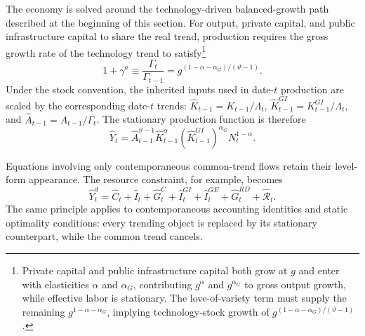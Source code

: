 \documentclass[a4paper,11pt]{article}
\begin{document}
The economy is solved around the technology-driven balanced-growth path described at the beginning of this section.
For output, private capital, and public infrastructure capital to share the real trend, production requires the gross growth rate of the technology trend to satisfy\footnote{Private capital and public infrastructure capital both grow at $g$ and enter with elasticities $\alpha$ and $\alpha_G$, contributing $g^{\alpha}$ and $g^{\alpha_G}$ to gross output growth, while effective labor is stationary. The love-of-variety term must supply the remaining $g^{1-\alpha-\alpha_G}$, implying technology-stock growth of $g^{(1-\alpha-\alpha_G)/(\vartheta-1)}$.}
\begin{equation} \label{eq:techtrend}
    1+\gamma^a\equiv\frac{\Gamma_t}{\Gamma_{t-1}}
    =g^{(1-\alpha-\alpha_G)/(\vartheta-1)}.
\end{equation}
Under the stock convention, the inherited inputs used in date-$t$ production are scaled by the corresponding date-$t$ trends: $\hat K_{t-1}=K_{t-1}/\Lambda_t$, $\hat K_{t-1}^{GI}=K_{t-1}^{GI}/\Lambda_t$, and $\hat A_{t-1}=A_{t-1}/\Gamma_t$.
The stationary production function is therefore
\begin{equation} \label{eq:prodstat}
    \hat{Y}_t = \hat{A}_{t-1}^{\vartheta-1} \hat K_{t-1}^{\alpha} \left( \hat K_{t-1}^{GI}\right)^{\alpha_G} N_t^{1-\alpha}.
\end{equation}

Equations involving only contemporaneous common-trend flows retain their level-form appearance.
The resource constraint, for example, becomes
\begin{equation} \label{eq:resourcestat}
    \hat{Y}_t^{d}=\hat{C}_t+\hat{I}_t+\hat{G}_t^{C}
    +\hat{I}_t^{GI}+\hat{I}_t^{GE}+\hat{G}_t^{RD}+\hat{\mathcal{R}}_t.
\end{equation}
The same principle applies to contemporaneous accounting identities and static optimality conditions: every trending object is replaced by its stationary counterpart, while the common trend cancels.
\end{document}
